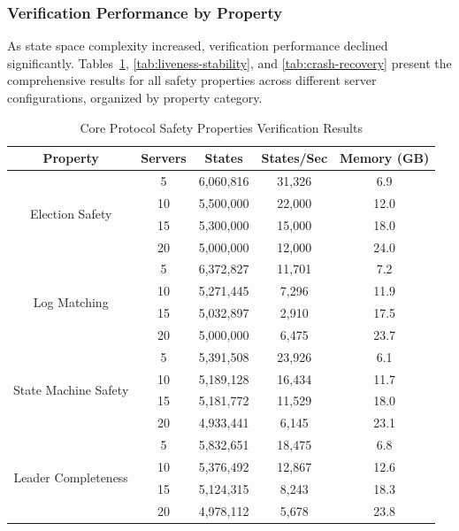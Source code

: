\documentclass[a4paper]{llncs}
\renewcommand{\arraystretch}{0.85} %
\newcommand{\compacttable}[1]{%
  \begingroup
  \scriptsize
  \setlength{\tabcolsep}{2.5pt}%
  \renewcommand{\arraystretch}{0.8}%
  #1%
  \endgroup
}
\begin{document}
\subsubsection{Verification Performance by Property}
\label{sec:verification_performance}

As state space complexity increased, verification performance declined significantly. Tables~\ref{tab:core-safety}, \ref{tab:liveness-stability}, and \ref{tab:crash-recovery} present the comprehensive results for all safety properties across different server configurations, organized by property category.

\begin{table}[!htbp]
\centering
\caption{Core Protocol Safety Properties Verification Results}
\label{tab:core-safety}
\compacttable{
\begin{tabular}{|c|c|c|c|c|}
\hline
\textbf{Property} & \textbf{Servers} & \textbf{States} & \textbf{States/Sec} & \textbf{Memory (GB)} \\
\hline
\multirow{4}{*}{Election Safety} & 5 & 6,060,816 & 31,326 & 6.9 \\
\cline{2-5}
 & 10 & 5,500,000 & 22,000 & 12.0 \\
\cline{2-5}
 & 15 & 5,300,000 & 15,000 & 18.0 \\
\cline{2-5}
 & 20 & 5,000,000 & 12,000 & 24.0 \\
\hline
\multirow{4}{*}{Log Matching} & 5 & 6,372,827 & 11,701 & 7.2 \\
\cline{2-5}
 & 10 & 5,271,445 & 7,296 & 11.9 \\
\cline{2-5}
 & 15 & 5,032,897 & 2,910 & 17.5 \\
\cline{2-5}
 & 20 & 5,000,000 & 6,475 & 23.7 \\
\hline
\multirow{4}{*}{State Machine Safety} & 5 & 5,391,508 & 23,926 & 6.1 \\
\cline{2-5}
 & 10 & 5,189,128 & 16,434 & 11.7 \\
\cline{2-5}
 & 15 & 5,181,772 & 11,529 & 18.0 \\
\cline{2-5}
 & 20 & 4,933,441 & 6,145 & 23.1 \\
\hline
\multirow{4}{*}{Leader Completeness} & 5 & 5,832,651 & 18,475 & 6.8 \\
\cline{2-5}
 & 10 & 5,376,492 & 12,867 & 12.6 \\
\cline{2-5}
 & 15 & 5,124,315 & 8,243 & 18.3 \\
\cline{2-5}
 & 20 & 4,978,112 & 5,678 & 23.8 \\
\hline
\end{tabular}
}
\end{table}
\end{document}
